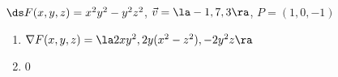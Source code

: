 {$\ds F(x,y,z) = x^2y^2-y^2z^2$, $\vec v = \la -1,7,3\ra$, $P = (1,0,-1)$
}
{
\begin{enumerate}
	\item $\nabla F(x,y,z) = \la 2xy^2, 2y(x^2-z^2), -2y^2z\ra$
	\item	$0$
\end{enumerate}
}